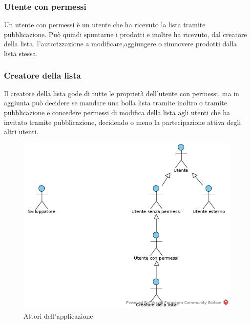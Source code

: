 \subsubsection{Utente con permessi}
Un utente con permessi è un utente che ha ricevuto la lista tramite pubblicazione. Può quindi spuntarne i prodotti e inoltre ha ricevuto, dal creatore della lista, l'autorizzazione a modificare,aggiungere o rimuovere prodotti dalla lista stessa.
\subsubsection{Creatore della lista}
Il creatore della lista gode di tutte le proprietà dell'utente con permessi, ma in aggiunta può decidere se mandare una bolla lista tramite inoltro o tramite pubblicazione e concedere permessi di modifica della lista agli utenti che ha invitato tramite pubblicazione, decidendo o meno la partecipazione attiva degli altri utenti.
\label{Attori}
\begin{figure}[ht]
	\centering
	\includegraphics[scale=1]{Usecases/img/Attori.png}
	\caption{Attori dell'applicazione}
\end{figure}



